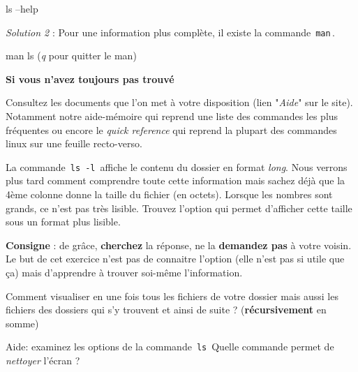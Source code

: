 \documentclass[a4paper,11pt]{article}
\begin{document}
\par

\begin{Exemple}{}
	ls --help
\end{Exemple}
\par
\textit{Solution 2} : Pour une information plus compl\`ete, il existe la commande \,\verb|man|\,.  

\par

\begin{Exemple}{}
	man ls (\textit{q} pour quitter le man)  
\end{Exemple}

\par
\textbf{Si vous n'avez toujours pas trouv\'e}
\par

Consultez les documents que l'on met \`a votre disposition 
(lien "\textit{Aide}" sur le site).
Notamment notre aide-m\'emoire qui reprend une liste des commandes les plus fr\'equentes 
ou encore le \textit{quick reference} 
qui reprend la plupart des commandes linux sur une feuille recto-verso.  

\par

\begin{Exercice}{} 
	La commande \,\verb|ls -l|\, 
	affiche le contenu du dossier en format \textit{long}.
	Nous verrons plus tard comment comprendre toute cette information 
	mais sachez d\'ej\`a que la 4\`eme colonne donne la taille du fichier (en octets).
	Lorsque les nombres sont grands, ce n'est pas tr\`es lisible. 
	Trouvez l'option qui permet d'afficher cette taille sous un format plus lisible.  
	
	\par
	\textbf{Consigne} : de gr\^ace, 
	\textbf{cherchez} la r\'eponse, 
	ne la \textbf{demandez pas} \`a votre voisin. 
	Le but de cet exercice n'est pas de connaitre l'option 
	(elle n'est pas si utile que \c ca) 
	mais d'apprendre \`a trouver soi-m\^eme l'information.  
	
	\par	
\end{Exercice}


\begin{Exercice}{}
Comment visualiser en une fois tous les fichiers de votre dossier 
mais aussi les fichiers des dossiers qui s'y trouvent et ainsi de suite ? 
(\textbf{r\'ecursivement} en somme)\par

Aide: examinez les options de la commande \,\verb|ls|\,  
Quelle commande permet de \textit{nettoyer} l'\'ecran ?  

\par
	
\end{Exercice}
\end{document}
